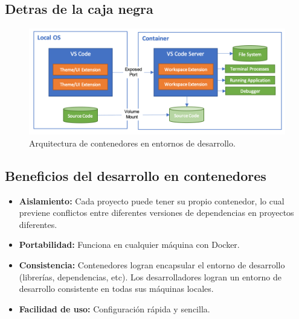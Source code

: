 \documentclass{beamer}
\begin{document}
\subsection{Detras de la caja negra}
\begin{frame}{\subsecname}
  \begin{figure}
    \centering
    \includegraphics[width=\textwidth]{images/architecture-containers.png}
    \caption{Arquitectura de contenedores en entornos de desarrollo.}
  \end{figure}
\end{frame}

\subsection{Beneficios del desarrollo en contenedores}
\begin{frame}{\subsecname}
  \begin{itemize}
    \item \textbf{Aislamiento:} Cada proyecto puede tener su propio contenedor, lo cual previene conflictos entre diferentes versiones de dependencias en proyectos diferentes.
    \item \textbf{Portabilidad:} Funciona en cualquier máquina con Docker.
    \item \textbf{Consistencia:} Contenedores logran encapsular el entorno de desarrollo (librerías, dependencias, etc). Los desarrolladores logran un entorno de desarrollo consistente en todas sus máquinas locales.
    \item \textbf{Facilidad de uso:} Configuración rápida y sencilla.
  \end{itemize}
\end{frame}
\end{document}
